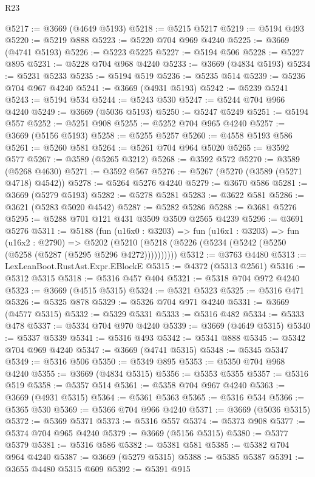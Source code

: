 \begin{lexlean}{R23}
\begin{coremodule}
@5217 := @3669 (@4649 @5193)
@5218 := @5215 @5217
@5219 := @5194 @493
@5220 := @5219 @888
@5223 := @5220 @704 @969 @4240
@5225 := @3669 (@4741 @5193)
@5226 := @5223 @5225
@5227 := @5194 @506
@5228 := @5227 @895
@5231 := @5228 @704 @968 @4240
@5233 := @3669 (@4834 @5193)
@5234 := @5231 @5233
@5235 := @5194 @519
@5236 := @5235 @514
@5239 := @5236 @704 @967 @4240
@5241 := @3669 (@4931 @5193)
@5242 := @5239 @5241
@5243 := @5194 @534
@5244 := @5243 @530
@5247 := @5244 @704 @966 @4240
@5249 := @3669 (@5036 @5193)
@5250 := @5247 @5249
@5251 := @5194 @557
@5252 := @5251 @908
@5255 := @5252 @704 @965 @4240
@5257 := @3669 (@5156 @5193)
@5258 := @5255 @5257
@5260 := @4558 @5193 @586
@5261 := @5260 @581
@5264 := @5261 @704 @964 @5020
@5265 := @3592 @577
@5267 := @3589 (@5265 @3212)
@5268 := @3592 @572
@5270 := @3589 (@5268 @4630)
@5271 := @3592 @567
@5276 := @5267 (@5270 (@3589 (@5271 @4718) @4542))
@5278 := @5264 @5276 @4240
@5279 := @3670 @586
@5281 := @3669 (@5279 @5193)
@5282 := @5278 @5281
@5283 := @3622 @581
@5286 := @3621 (@5283 @5020 @4542)
@5287 := @5282 @5286
@5288 := @3681 @5276
@5295 := @5288 @701 @121 @431 @3509 @3509 @2565 @4239
@5296 := @3691 @5276
@5311 := @5188
    (fun (u16x0 : @3203) =>
    fun (u16x1 : @3203) =>
    fun (u16x2 : @2790) =>
    @5202 (@5210 (@5218 (@5226 (@5234 (@5242 (@5250 (@5258 (@5287 (@5295 @5296 @4272))))))))))
@5312 := @3763 @4480
@5313 := LexLeanBoot.RustAst.Expr.EBlockE
@5315 := @4372 (@5313 @2561)
@5316 := @5312 @5315
@5318 := @5316 @457 @404
@5321 := @5318 @704 @972 @4240
@5323 := @3669 (@4515 @5315)
@5324 := @5321 @5323
@5325 := @5316 @471
@5326 := @5325 @878
@5329 := @5326 @704 @971 @4240
@5331 := @3669 (@4577 @5315)
@5332 := @5329 @5331
@5333 := @5316 @482
@5334 := @5333 @478
@5337 := @5334 @704 @970 @4240
@5339 := @3669 (@4649 @5315)
@5340 := @5337 @5339
@5341 := @5316 @493
@5342 := @5341 @888
@5345 := @5342 @704 @969 @4240
@5347 := @3669 (@4741 @5315)
@5348 := @5345 @5347
@5349 := @5316 @506
@5350 := @5349 @895
@5353 := @5350 @704 @968 @4240
@5355 := @3669 (@4834 @5315)
@5356 := @5353 @5355
@5357 := @5316 @519
@5358 := @5357 @514
@5361 := @5358 @704 @967 @4240
@5363 := @3669 (@4931 @5315)
@5364 := @5361 @5363
@5365 := @5316 @534
@5366 := @5365 @530
@5369 := @5366 @704 @966 @4240
@5371 := @3669 (@5036 @5315)
@5372 := @5369 @5371
@5373 := @5316 @557
@5374 := @5373 @908
@5377 := @5374 @704 @965 @4240
@5379 := @3669 (@5156 @5315)
@5380 := @5377 @5379
@5381 := @5316 @586
@5382 := @5381 @581
@5385 := @5382 @704 @964 @4240
@5387 := @3669 (@5279 @5315)
@5388 := @5385 @5387
@5391 := @3655 @4480 @5315 @609
@5392 := @5391 @915

\end{coremodule}
\end{lexlean}
